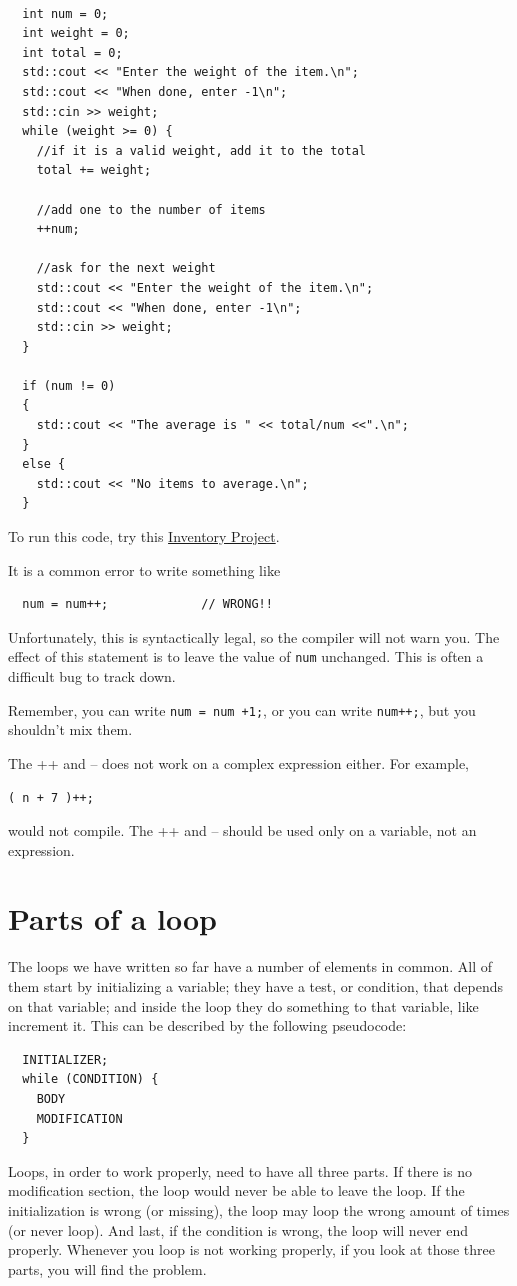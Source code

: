 \begin{lstlisting}
  
  int num = 0;
  int weight = 0;
  int total = 0;
  std::cout << "Enter the weight of the item.\n";
  std::cout << "When done, enter -1\n";
  std::cin >> weight;
  while (weight >= 0) {
    //if it is a valid weight, add it to the total
    total += weight;
    
    //add one to the number of items
    ++num;
    
    //ask for the next weight
    std::cout << "Enter the weight of the item.\n";
    std::cout << "When done, enter -1\n";
    std::cin >> weight;    
  }
  
  if (num != 0)
  {
    std::cout << "The average is " << total/num <<".\n"; 
  }
  else {
    std::cout << "No items to average.\n";
  }
\end{lstlisting}
%
To run this code, try this \href{https://replit.com/@lpatacch/inventory#inventory.cpp}{Inventory Project}.

It is a common error to write something like

\begin{verbatim}
  num = num++;             // WRONG!!
\end{verbatim}
%
Unfortunately, this is syntactically legal, so the compiler
will not warn you.  The effect of this statement is to leave
the value of {\tt num} unchanged.  This is often a difficult
bug to track down.

Remember, you can write {\tt num = num +1;}, or you
can write {\tt num++;}, but you shouldn't mix them.

The ++ and -- does not work on a complex expression either. For example, 

\begin {verbatim}
( n + 7 )++;
\end{verbatim}
would not compile. The ++ and -- should be used only on a variable, not an expression.

\section{Parts of a loop}
The loops we have written so far have a number of elements
in common.  All of them start by initializing a variable;
they have a test, or condition, that depends on that variable;
and inside the loop they do something to that variable,
like increment it. This can be described by the following pseudocode:
\begin{verbatim}
  INITIALIZER;
  while (CONDITION) {
    BODY
    MODIFICATION
  }
\end{verbatim}
Loops, in order to work properly, need to have all three parts. If there is no modification section, the loop would never be able to leave the loop. If the initialization is wrong (or missing), the loop may loop the wrong amount of times (or never loop). And last, if the condition is wrong, the loop will never end properly. Whenever you loop is not working properly, if you look at those three parts, you will find the problem.

